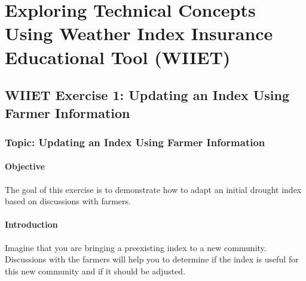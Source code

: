 \documentclass[letterpaper,10pt,english]{sphinxmanual}
\begin{document}
\chapter{Exploring Technical Concepts Using Weather Index Insurance Educational Tool (WIIET)}
\label{index_updated_educationalMat:exploring-technical-concepts-using-weather-index-insurance-educational-tool-wiiet}

\section{WIIET Exercise 1: Updating an Index Using Farmer Information}
\label{wiiet/wiiet_usingfarmerinformation_Web:wiiet-exercise-1-updating-an-index-using-farmer-information}\label{wiiet/wiiet_usingfarmerinformation_Web::doc}

\subsection{Topic: Updating an Index Using Farmer Information}
\label{wiiet/wiiet_usingfarmerinformation_Web:topic-updating-an-index-using-farmer-information}

\subsubsection{Objective}
\label{wiiet/wiiet_usingfarmerinformation_Web:objective}
The goal of this exercise is to demonstrate how to adapt an initial drought index based on discussions with farmers.


\subsubsection{Introduction}
\label{wiiet/wiiet_usingfarmerinformation_Web:introduction}
Imagine that you are bringing a preexisting index to a new community. Discussions with the farmers will help you to determine if the index is useful for this new community and if it should be adjusted.
\end{document}
